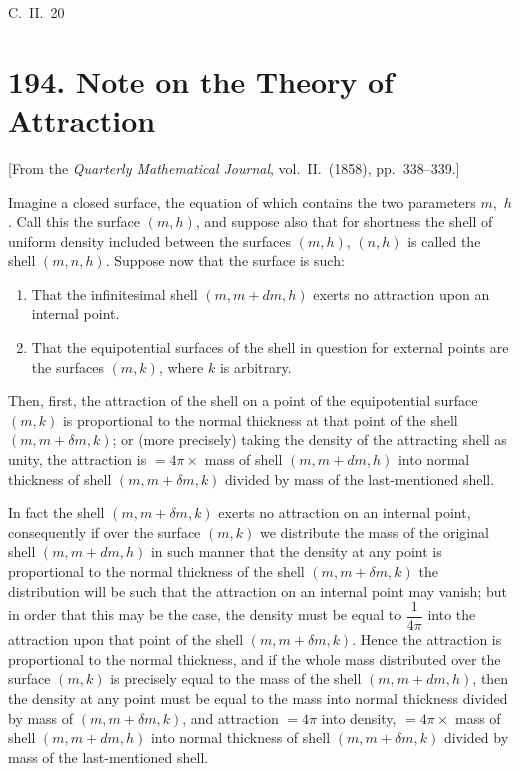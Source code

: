 \documentclass[11pt,a4paper]{book}
\begin{document}
\hfill C.~II.~20

\newpage


\section*{194. Note on the Theory of Attraction}

\begin{center}
[From the \textit{Quarterly Mathematical Journal}, vol.~II.~(1858), pp.~338--339.]
\end{center}

\bigskip

\noindent
Imagine a closed surface, the equation of which contains the two parameters $m$,~$h$.
Call this the surface $(m, h)$, and suppose also that for shortness the shell of uniform
density included between the surfaces $(m, h)$, $(n, h)$ is called the shell $(m, n, h)$.
Suppose now that the surface is such:

\begin{enumerate}
\item That the infinitesimal shell $(m, m + dm, h)$ exerts no attraction upon an
internal point.
\item That the equipotential surfaces of the shell in question for external points
are the surfaces $(m, k)$, where $k$ is arbitrary.
\end{enumerate}

Then, first, the attraction of the shell on a point of the equipotential surface
$(m, k)$ is proportional to the normal thickness at that point of the shell $(m, m+\delta m, k)$;
or (more precisely) taking the density of the attracting shell as unity, the attraction is
$= 4\pi \times$ mass of shell $(m, m + dm, h)$ into normal thickness of shell $(m, m + \delta m, k)$
divided by mass of the last-mentioned shell.

In fact the shell $(m, m+\delta m, k)$ exerts no attraction on an internal point,
consequently if over the surface $(m, k)$ we distribute the mass of the original shell
$(m, m+dm, h)$ in such manner that the density at any point is proportional to the
normal thickness of the shell $(m, m+\delta m, k)$ the distribution will be such that the
attraction on an internal point may vanish; but in order that this may be the case,
the density must be equal to $\dfrac{1}{4\pi}$ into the attraction upon that point of the shell
$(m, m+\delta m, k)$. Hence the attraction is proportional to the normal thickness, and if
the whole mass distributed over the surface $(m, k)$ is precisely equal to the mass of
the shell $(m, m + dm, h)$, then the density at any point must be equal to the mass
into normal thickness divided by mass of $(m, m + \delta m, k)$, and attraction $= 4\pi$ into
density, $= 4\pi \times$ mass of shell $(m, m+dm, h)$ into normal thickness of shell $(m, m+\delta m, k)$
divided by mass of the last-mentioned shell.
\end{document}
